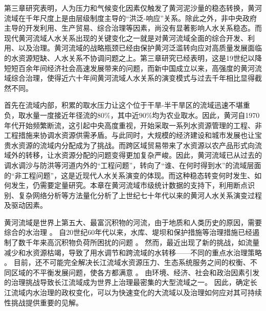 第三章研究表明，人为压力和气候变化因素仅触发了黄河泥沙量的稳态转换，黄河流域在千年尺度上是由层级制度主导的“洪泛-响应”关系。除此之外，非中央政府主导的开发利用、生产贸易、综合治理等因素，尚没有显著影响人水关系稳态。而现代黄河流域人水关系出现的关键变化之一就是对黄河流域全面的综合开发、利用、以及治理。黄河流域的战略瓶颈已经由保护黄河泛滥转向应对高质量发展面临的水资源短缺、人水关系不协调问题之上。第三章研究已经表明，这是19世纪以降短短百余年间经济社会高速发展带来的问题，而新中国成立以来，高强度的黄河流域综合治理，使得近六十年间黄河流域人水关系的演变模式与过去千年相比显得截然不同。

首先在流域内部，积累的取水压力让这个位于干旱-半干旱区的流域迅速不堪重负，取水量一度接近年径流的$80\%$，其中近$90\%$均为农业取水。因此，黄河自1970年代开始频繁断流，这引起中央高度重视，开始采取一系列水资源管理的工程、非工程措施来协调水资源供需矛盾。与此同时，大规模的经济建设和城市发展也让宝贵水资源的流域内分配成为了挑战。而跨区域贸易带来了水资源以农产品形式向流域外的转移，让水资源分配的问题变得更加复杂严峻。因此，黄河流域已从过去的调水调沙与防洪等河道内外的“工程问题”，转向了“谁、在何时得到水”的流域层面的“非工程问题”，这是近现代人水关系演变的体现。而这种稳态转变何时发生、如何发生，仍需要定量研究。本章在黄河流域市级统计数据的支持下，利用断点识别、复杂网络分析等方法量化分析了上世纪七十年代以来的黄河人水关系演变过程及驱动因素。

黄河流域是世界上第五大、最富沉积物的河流，由于地质和人类历史的原因，需要综合的水治理
\cite{mostern2021,best2019}。
自20世纪60年代以来，水库、堤坝和保护措施等治理措施已经遏制了数千年来高沉积物负荷所困扰的问题
\cite{wang2016e,song2020a}。
然而，最近出现了新的挑战，如流量减少和水资源枯竭，导致了用水调节和跨流域的水转移——不同的重点水治理策略
\cite{wang2019c}。
目前，还不可能完全解决长江流域水资源压力、生态系统服务之间的权衡、不同区域的不平衡发展问题，使各方都满意
\cite{wohlfart2016a}。
由环境、经济、社会和政治因素引发的治理挑战导致长江流域成为世界上治理最密集的大型流域之一。
因此，确定长江流域内水治理的政权变化，可以为快速变化的大流域以及治理如何应对其可持续性挑战提供重要的见解。